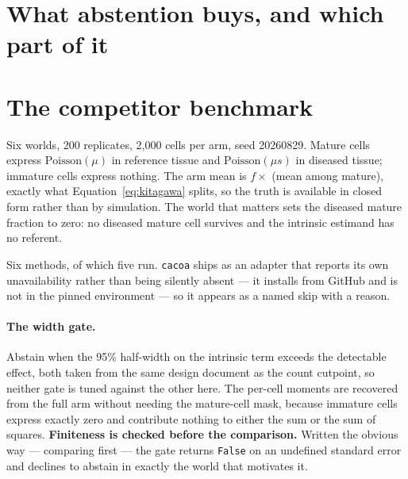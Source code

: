 \section{What abstention buys, and which part of it}
\label{app:benchtable}



\section{The competitor benchmark}
\label{app:bench}

Six worlds, 200 replicates, 2{,}000 cells per arm, seed 20260829. Mature cells
express $\mathrm{Poisson}(\mu)$ in reference tissue and $\mathrm{Poisson}(\mu s)$
in diseased tissue; immature cells express nothing. The arm mean is
$f \times$ (mean among mature), exactly what Equation~\ref{eq:kitagawa} splits,
so the truth is available in closed form rather than by simulation. The world
that matters sets the diseased mature fraction to zero: no diseased mature cell
survives and the intrinsic estimand has no referent.

Six methods, of which five run. \texttt{cacoa} ships as an adapter that reports
its own unavailability rather than being silently absent --- it installs from
GitHub and is not in the pinned environment --- so it appears as a named skip
with a reason.

\paragraph{The width gate.} Abstain when the 95\% half-width on the intrinsic
term exceeds the detectable effect, both taken from the same design document as
the count cutpoint, so neither gate is tuned against the other here. The
per-cell moments are recovered from the full arm without needing the mature-cell
mask, because immature cells express exactly zero and contribute nothing to
either the sum or the sum of squares. \textbf{Finiteness is checked before the
comparison.} Written the obvious way --- comparing first --- the gate returns
\texttt{False} on an undefined standard error and declines to abstain in exactly
the world that motivates it.


